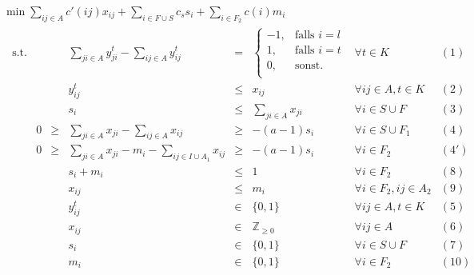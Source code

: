 \documentclass[11pt,a4paper]{article}
\newcommand{\Z}{\mathbb{Z}}
\theoremstyle{my_th_style1}
\begin{document}
  \bigskip
  $\min \displaystyle\sum_{ij \in A} c'(ij) x_{ij} + \displaystyle\sum_{i \in F \cup S} c_s s_i + \displaystyle\sum_{i \in F_2} c(i) m_i$
  \begin{align*}\label{model_p2mpgk}
  \begin{array}{rcrcrcll}
  \textrm{s.t.}  
  && &\displaystyle\sum_{ji \in A} y_{ji}^t - \displaystyle\sum_{ij \in A} y_{ij}^t& = & \left\{\begin{array}{cl} 
  -1, & \text{falls } i=l\\ 
  1, & \text{falls } i=t\\ 
  0, & \text{sonst.}\\ 
  \end{array}
  \right. & \forall t \in K & (1) \\
  &&& y_{ij}^t & \leq & x_{ij} & \forall ij \in A, t\in K & (2)\\
    &&& s_i &\leq& \displaystyle\sum_{ji \in A} x_{ji}& \forall  i \in S \cup F & (3)\\ 
  &0&\geq&\displaystyle\sum_{ji \in A} x_{ji} - \displaystyle\sum_{ij \in A} x_{ij}&\geq& -(a-1)s_i & \forall i \in S \cup F_1& (4)\\
   &0&\geq&\displaystyle\sum_{ji \in A} x_{ji} -m_i - \displaystyle\sum_{ij \in I \cup A_1} x_{ij}&\geq& -(a-1)s_i & \forall i \in F_2& (4')\\
   &&&s_i+m_i & \leq & 1 & \forall i \in F_2 & (8)\\
   &&&x_{ij}& \leq & m_i & \forall i \in F_2, ij \in A_2 & (9) \\
    &&& y_{ij}^t & \in & \{0,1 \}& \forall ij \in A, t \in K & (5)\\
    &&& x_{ij} & \in & \Z_{\geq 0} & \forall ij \in A & (6)\\
    &&& s_i & \in & \{ 0,1 \} & \forall i \in S \cup F & (7) \\
    &&& m_i & \in & \{ 0,1 \} & \forall i \in F_2 & (10) \\
  \end{array}
  \end{align*}
  
\end{document}

